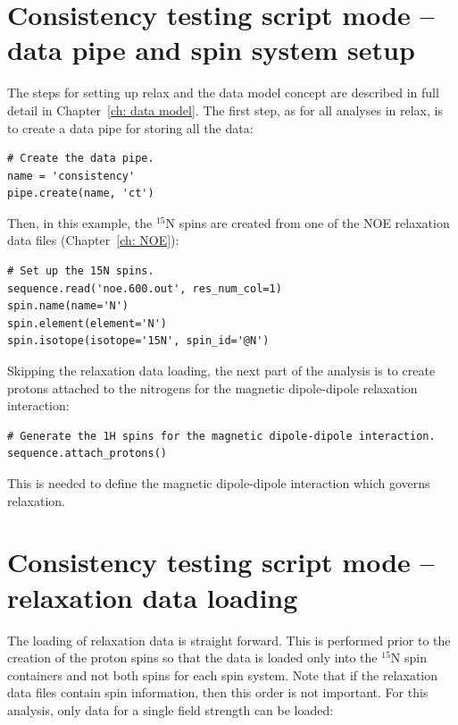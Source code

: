 
\section{Consistency testing script mode -- data pipe and spin system setup}

The steps for setting up relax and the data model concept are described in full detail in Chapter~\ref{ch: data model}.  The first step, as for all analyses in relax, is to create a data pipe for storing all the data:

\begin{lstlisting}[firstnumber=31]
# Create the data pipe.
name = 'consistency'
pipe.create(name, 'ct')
\end{lstlisting}

Then, in this example, the $^{15}$N spins are created from one of the NOE relaxation data files (Chapter~\ref{ch: NOE}):

\begin{lstlisting}[firstnumber=35]
# Set up the 15N spins.
sequence.read('noe.600.out', res_num_col=1)
spin.name(name='N')
spin.element(element='N')
spin.isotope(isotope='15N', spin_id='@N')
\end{lstlisting}

Skipping the relaxation data loading, the next part of the analysis is to create protons attached to the nitrogens for the magnetic dipole-dipole relaxation interaction:

\begin{lstlisting}[firstnumber=46]
# Generate the 1H spins for the magnetic dipole-dipole interaction.
sequence.attach_protons()
\end{lstlisting}

This is needed to define the magnetic dipole-dipole interaction which governs relaxation.




\section{Consistency testing script mode -- relaxation data loading}

The loading of relaxation data is straight forward.  This is performed prior to the creation of the proton spins so that the data is loaded only into the $^{15}$N spin containers and not both spins for each spin system.  Note that if the relaxation data files contain spin information, then this order is not important.  For this analysis, only data for a single field strength can be loaded:

